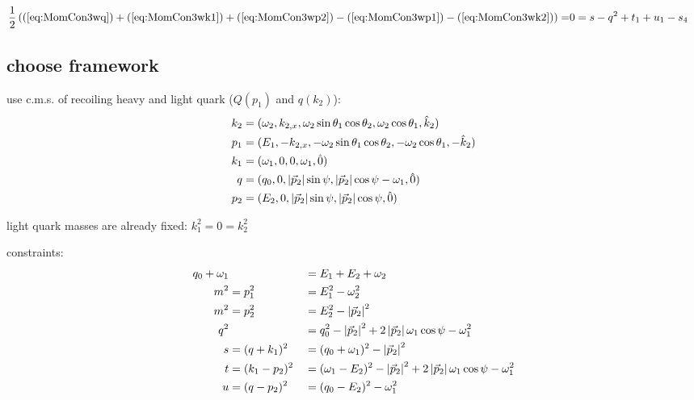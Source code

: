 \documentclass[
  english,		%
  a4paper,		%
  11pt,			%
  DIV=12,
  titlepage,
  toc=bibnumbered,
  parskip=full,  	%
  headings=normal,
  BCOR=12mm,
  numbers=noenddot
]{scrartcl}
\begin{document}
\begin{align}
\frac 1 2 \left((\ref{eq:MomCon3wq}) + (\ref{eq:MomCon3wk1}) + (\ref{eq:MomCon3wp2}) - (\ref{eq:MomCon3wp1}) - (\ref{eq:MomCon3wk2})\right)=&0= s - q^2 + t_1 + u_1 - s_4
\end{align}

\subsection{choose framework}
use c.m.s. of recoiling heavy and light quark ($Q(p_1)$ and $q(k_2)$):
\begin{align}
k_2 &= (\omega_2,k_{2,x},\omega_2\sin\theta_1\cos\theta_2,\omega_2\cos\theta_1, \hat k_2)\\
p_1 &= (E_1,-k_{2,x},-\omega_2\sin\theta_1\cos\theta_2,-\omega_2\cos\theta_1, -\hat k_2)\\
k_1 &= (\omega_1,0,0,\omega_1, \hat 0)\\
q &= (q_0,0,\left|\vec p_2\right|\sin\psi,\left|\vec p_2\right|\cos\psi-\omega_1, \hat 0)\\
p_2 &= (E_2,0,\left|\vec p_2\right|\sin\psi,\left|\vec p_2\right|\cos\psi, \hat 0)
\end{align}

light quark masses are already fixed: $k_1^2 = 0 = k_2^2$

constraints:
\begin{align}
q_0+\omega_1 & &&=E_1+E_2+\omega_2 \label{eq:PSConMomCon}\\
m^2 &= p_1^2 &&= E_1^2 - \omega_2^2 \label{eq:PSConp1}\\
m^2 &= p_2^2 &&= E_2^2 - \left|\vec p_2\right|^2 \label{eq:PSConp2} \\
q^2 & &&= q_0^2 - \left|\vec p_2\right|^2 + 2\left|\vec p_2\right|\omega_1\cos\psi-\omega_1^2 \label{eq:PSConq}\\
s &= (q+k_1)^2 &&= (q_0+\omega_1)^2 - \left|\vec p_2\right|^2 \label{eq:PSCons}\\
t &= (k_1-p_2)^2 &&= (\omega_1-E_2)^2-\left|\vec p_2\right|^2+2\left|\vec p_2\right|\omega_1\cos\psi-\omega_1^2 \label{eq:PSCont}\\
u &= (q-p_2)^2 &&= (q_0-E_2)^2 - \omega_1^2 \label{eq:PSConu}
\end{align}
\end{document}
